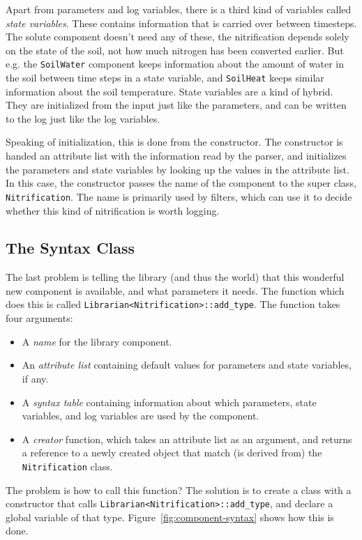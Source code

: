 \documentclass{article}
\newcommand{\code}[1]{\texttt{#1}}
\begin{document}
Apart from parameters and log variables, there is a third kind of
variables called \emph{state variables}.  These contains information
that is carried over between timesteps.  The solute component doesn't
need any of these, the nitrification depends solely on the state of
the soil, not how much nitrogen has been converted earlier.  But e.g.
the \code{SoilWater} component keeps information about the amount of
water in the soil between time steps in a state variable, and
\code{SoilHeat} keeps similar information about the soil temperature.
State variables are a kind of hybrid.  They are initialized from the
input just like the parameters, and can be written to the log just
like the log variables.

Speaking of initialization, this is done from the constructor.  The
constructor is handed an attribute list with the information read by
the parser, and initializes the parameters and state variables by
looking up the values in the attribute list.  In this case, the
constructor passes the name of the component to the super class,
\code{Nitrification}.  The name is primarily used by filters, which
can use it to decide whether this kind of nitrification is worth
logging. 

\subsection{The Syntax Class}

The last problem is telling the library (and thus the world) that this
wonderful new component is available, and what parameters it needs.
The function which does this is called
\code{Librarian<Nitrification>::add\_type}.  The function takes four
arguments:
\begin{itemize}
\item A \emph{name} for the library component.
\item An \emph{attribute list} containing default values for
  parameters and state variables, if any.
\item A \emph{syntax table} containing information about which
  parameters, state variables, and log variables are used by the
  component. 
\item A \emph{creator} function, which takes an attribute list as an
  argument, and returns a reference to a newly created object that
  match (is derived from) the \code{Nitrification} class.
\end{itemize}
The problem is how to call this function?  The solution is to create a
class with a constructor that calls
\code{Librarian<Nitrification>::add\_type}, and declare a global
variable of that type.  Figure~\ref{fig:component-syntax} shows how
this is done.
\end{document}
